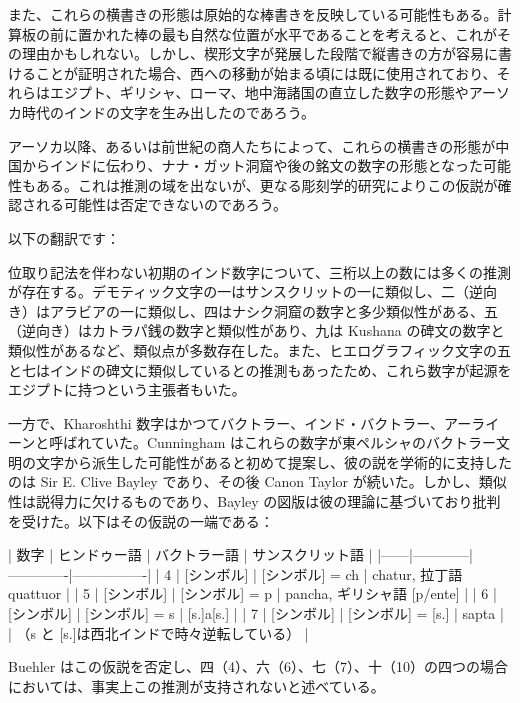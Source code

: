 \documentclass[a4paper,11pt,openany]{ltjsbook}
\begin{document}
また、これらの横書きの形態は原始的な棒書きを反映している可能性もある。計算板の前に置かれた棒の最も自然な位置が水平であることを考えると、これがその理由かもしれない。しかし、楔形文字が発展した段階で縦書きの方が容易に書けることが証明された場合、西への移動が始まる頃には既に使用されており、それらはエジプト、ギリシャ、ローマ、地中海諸国の直立した数字の形態やアーソカ時代のインドの文字を生み出したのであろう。

アーソカ以降、あるいは前世紀の商人たちによって、これらの横書きの形態が中国からインドに伝わり、ナナ・ガット洞窟や後の銘文の数字の形態となった可能性もある。これは推測の域を出ないが、更なる彫刻学的研究によりこの仮説が確認される可能性は否定できないのであろう。

以下の翻訳です：

位取り記法を伴わない初期のインド数字について、三桁以上の数には多くの推測が存在する。デモティック文字の一はサンスクリットの一に類似し、二（逆向き）はアラビアの一に類似し、四はナシク洞窟の数字と多少類似性がある、五（逆向き）はカトラパ銭の数字と類似性があり、九は Kushana の碑文の数字と類似性があるなど、類似点が多数存在した。また、ヒエログラフィック文字の五と七はインドの碑文に類似しているとの推測もあったため、これら数字が起源をエジプトに持つという主張者もいた。

一方で、Kharoshthi 数字はかつてバクトラー、インド・バクトラー、アーライーンと呼ばれていた。Cunningham はこれらの数字が東ペルシャのバクトラー文明の文字から派生した可能性があると初めて提案し、彼の説を学術的に支持したのは Sir E. Clive Bayley であり、その後 Canon Taylor が続いた。しかし、類似性は説得力に欠けるものであり、Bayley の図版は彼の理論に基づいており批判を受けた。以下はその仮説の一端である：

| 数字 | ヒンドゥー語 | バクトラー語 | サンスクリット語 |
|------|------------|-------------|----------------|
| 4    | [シンボル]  | [シンボル] = ch | chatur, 拉丁語 quattuor |
| 5    | [シンボル]  | [シンボル] = p  | pancha, ギリシャ語 [p/ente] |
| 6    | [シンボル]  | [シンボル] = s  | [s.]a[s.] |
| 7    | [シンボル]  | [シンボル] = [s.] | sapta |
| （s と [s.]は西北インドで時々逆転している） |

Buehler はこの仮説を否定し、四（4）、六（6）、七（7）、十（10）の四つの場合においては、事実上この推測が支持されないと述べている。
\end{document}
